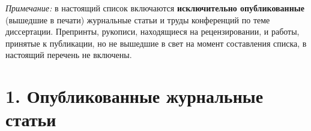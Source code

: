 \documentclass[11pt,a4paper]{article}
\begin{document}
\vspace{-0.2cm}

\textit{Примечание:} в настоящий список включаются \textbf{исключительно опубликованные} (вышедшие в печати) журнальные статьи и труды конференций по теме диссертации. Препринты, рукописи, находящиеся на рецензировании, и работы, принятые к публикации, но не вышедшие в свет на момент составления списка, в настоящий перечень не включены.

\vspace{-0.2cm}

\section*{1. Опубликованные журнальные статьи}
\end{document}
